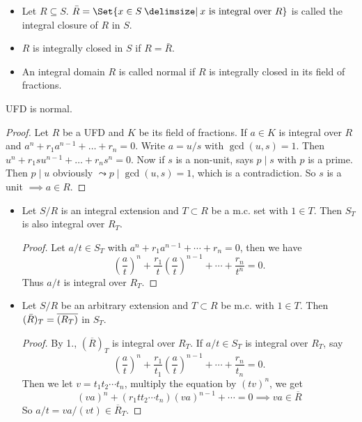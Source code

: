 \begin{definition} \mbox{}
  \begin{itemize}
    \item Let $R \subseteq S$. $\bar{R} = \Set{ x\in S \given x
      \text{ is integral over } R}$ is called the integral closure of $R$ in $S$.
    \item $R$ is integrally closed in $S$ if $R = \bar{R}$.
    \item An integral domain $R$ is called normal if $R$ is integrally closed
      in its field of fractions.
  \end{itemize}
\end{definition}

\begin{theorem} \label{thm:ufd-is-normal}
  UFD is normal.
  \begin{proof}
    Let $R$ be a UFD and $K$ be its field of fractions.
    If $a \in K$ is integral over $R$ and $a^n + r_1a^{n-1} + \dots + r_n = 0$.
    Write $a = u/s$ with $\gcd(u, s) = 1$.
    Then $u^n + r_1 s u^{n-1} + \dots + r_n s^n = 0$.
    Now if $s$ is a non-unit, says $p \mid s$ with $p$ is a prime. Then
    $p \mid u$ obviously $\leadsto p \mid \gcd(u, s) = 1$, which is a contradiction.
    So $s$ is a unit $\implies a \in R$.
  \end{proof}
\end{theorem}

\begin{prop} \mbox{}
  \begin{itemize}
    \item Let $S/R$ is an integral extension and $T \subset R$ be a m.c. set
      with $1 \in T$. Then $S_T$ is also integral over $R_T$.

    \begin{proof}
      Let $a/t \in S_T$ with $a^n + r_1 a^{n-1} + \dotsb + r_n = 0$,
      then we have
      \[
        \left(\frac{a}{t}\right)^n +
        \frac{r_1}{t}\left(\frac{a}{t}\right)^{n-1} +
        \dotsb + \frac{r_n}{t^n} = 0.
      \]
      Thus $a/t$ is integral over $R_T$.
    \end{proof}
    \item Let $S/R$ be an arbitrary extension and $T \subset R$ be m.c.
      with $1 \in T$. Then $(\bar{R})_T = \overline{(R_T)}$ in $S_T$.

    \begin{proof}
      By 1., $(\overline{R})_T$ is integral over $R_T$.
      If $a/t \in S_T$ is integral over $R_T$, say
      \[
        \left(\frac{a}{t}\right)^n +
        \frac{r_1}{t_1}\left(\frac{a}{t}\right)^{n-1} +
        \dotsb + \frac{r_n}{t_n} = 0.
      \]
      Then we let $v = t_1 t_2 \dotsm t_n$,
      multiply the equation by $(tv)^n$, we get
      \[ (va)^n +
          (r_1 t t_2 \dotsm t_n) (v a)^{n-1} +
          \dotsb = 0 \implies va \in \overline{R} \]
      So $a/t = va / (vt) \in \overline{R}_T$.
    \end{proof}
  \end{itemize}
\end{prop}

